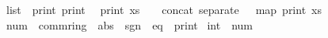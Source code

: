 \begin{isabellebody}
\isanewline
{}\isamarkupfalse%
\ list\ {\isacharcolon}{\isacharcolon}\ {\isacharparenleft}print{\isacharparenright}\ print\isanewline
{}\isanewline
\isanewline
{}\isamarkupfalse%
\isanewline
\ \ {\isachardoublequoteopen}print\ xs\ {\isacharequal}\ {\isacharprime}{\isacharprime}{\isacharbrackleft}{\isacharprime}{\isacharprime}\ {\isacharat}\ concat\ {\isacharparenleft}separate\ {\isacharprime}{\isacharprime}{\isacharcomma}\ {\isacharprime}{\isacharprime}\ {\isacharparenleft}map\ print\ xs{\isacharparenright}{\isacharparenright}\ {\isacharat}\ {\isacharprime}{\isacharprime}{\isacharbrackright}{\isacharprime}{\isacharprime}{\isachardoublequoteclose}\isanewline
\isanewline
{}\isamarkupfalse%
%
\isadelimproof
\ %
\endisadelimproof
%
\isatagproof
\isacommand{{\isachardot}{\isachardot}}\isamarkupfalse%
%
\endisatagproof
{\isafoldproof}%
%
\isadelimproof
%
\endisadelimproof
\isanewline
\isanewline
{}\isamarkupfalse%
\isanewline
\isanewline
{}\isamarkupfalse%
\ num\ {\isacharequal}\ comm{\isacharunderscore}ring{\isacharunderscore}{}\ {\isacharplus}\ abs\ {\isacharplus}\ sgn\ {\isacharplus}\ eq\ {\isacharplus}\ print\isanewline
\isanewline
{}\isamarkupfalse%
\ int\ {\isacharcolon}{\isacharcolon}\ num%
\isadelimproof
\ %
\endisadelimproof
%
\isatagproof
\isacommand{{\isachardot}{\isachardot}}\isamarkupfalse%
%
\endisatagproof
{\isafoldproof}%
%
\isadelimproof
%
\endisadelimproof
\isanewline
%
\isadelimtheory
\isanewline
%
\endisadelimtheory
%
\isatagtheory
{}\isamarkupfalse%
%
\endisatagtheory
{\isafoldtheory}%
%
\isadelimtheory
%
\endisadelimtheory
%
\end{isabellebody}%
